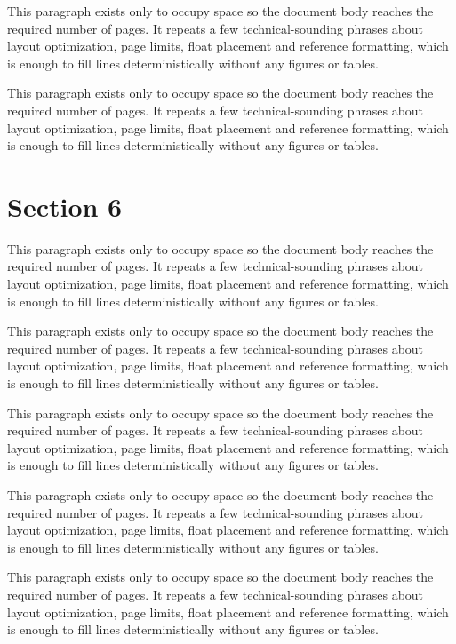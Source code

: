 \documentclass[10pt,letterpaper]{article}
\begin{document}
This paragraph exists only to occupy space so the document body reaches the required number of pages. It repeats a few technical-sounding phrases about layout optimization, page limits, float placement and reference formatting, which is enough to fill lines deterministically without any figures or tables.

This paragraph exists only to occupy space so the document body reaches the required number of pages. It repeats a few technical-sounding phrases about layout optimization, page limits, float placement and reference formatting, which is enough to fill lines deterministically without any figures or tables.

\section{Section 6}
This paragraph exists only to occupy space so the document body reaches the required number of pages. It repeats a few technical-sounding phrases about layout optimization, page limits, float placement and reference formatting, which is enough to fill lines deterministically without any figures or tables.

This paragraph exists only to occupy space so the document body reaches the required number of pages. It repeats a few technical-sounding phrases about layout optimization, page limits, float placement and reference formatting, which is enough to fill lines deterministically without any figures or tables.

This paragraph exists only to occupy space so the document body reaches the required number of pages. It repeats a few technical-sounding phrases about layout optimization, page limits, float placement and reference formatting, which is enough to fill lines deterministically without any figures or tables.

This paragraph exists only to occupy space so the document body reaches the required number of pages. It repeats a few technical-sounding phrases about layout optimization, page limits, float placement and reference formatting, which is enough to fill lines deterministically without any figures or tables.

This paragraph exists only to occupy space so the document body reaches the required number of pages. It repeats a few technical-sounding phrases about layout optimization, page limits, float placement and reference formatting, which is enough to fill lines deterministically without any figures or tables.
\end{document}
